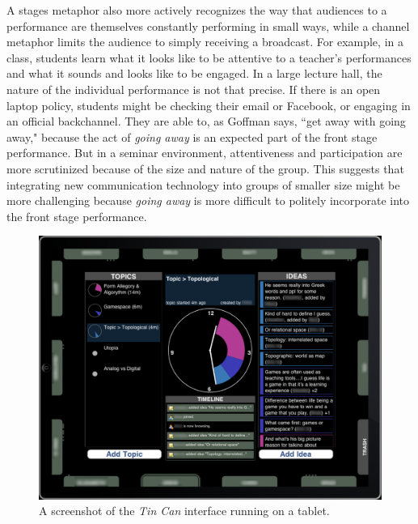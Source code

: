 A stages metaphor also more actively recognizes the way that audiences to a performance are themselves constantly performing in small ways, while a channel metaphor limits the audience to simply receiving a broadcast. For example, in a class, students learn what it looks like to be attentive to a teacher's performances and what it sounds and looks like to be engaged. In a large lecture hall, the nature of the individual performance is not that precise. If there is an open laptop policy, students might be checking their email or Facebook, or engaging in an official backchannel.  They are able to, as Goffman says, ``get away with going away," because the act of \emph{going away} is an expected part of the front stage performance. But in a seminar environment, attentiveness and participation are more scrutinized because of the size and nature of the group. This suggests that integrating new communication technology into groups of smaller size might be more challenging because \emph{going away} is more difficult to politely incorporate into the front stage performance.  


\begin{figure}[t]
\centering
\includegraphics{figures/tincan/tincan_interface.png}
\caption{A screenshot of the \emph{Tin Can} interface running on a tablet.}
\label{f:interface}
\end{figure}

